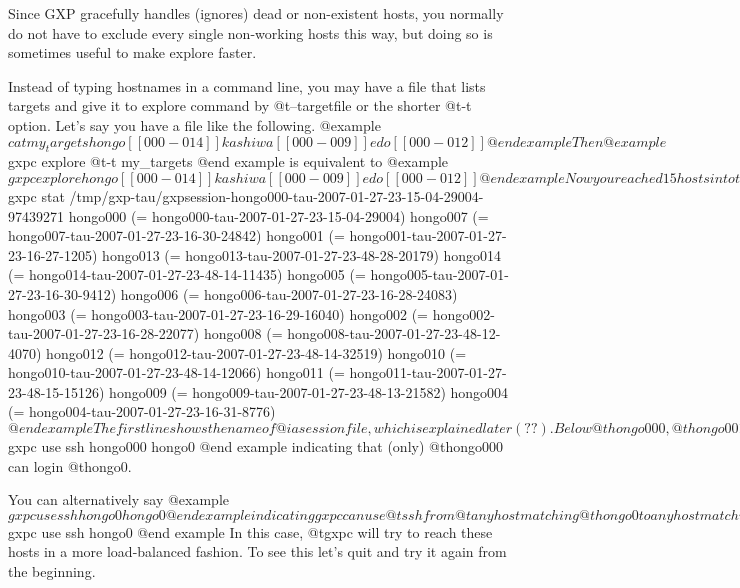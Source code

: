 Since GXP gracefully handles (ignores) dead or non-existent hosts, you
normally do not have to exclude every single non-working hosts this
way, but doing so is sometimes useful to make explore faster.

Instead of typing hostnames in a command line, you may have a file
that lists targets and give it to explore command by 
@t{--targetfile} or the shorter @t{-t} option.
Let's say you have a file like the following.
@example
$ cat my_targets
hongo[[000-014]]
kashiwa[[000-009]]
edo[[000-012]]
@end example
Then
@example
$ gxpc explore @t{-t my_targets}
@end example
is equivalent to
@example
$ gxpc explore hongo[[000-014]] kashiwa[[000-009]] edo[[000-012]]
@end example

Now you reached 15 hosts in total. The @t{stat} command shows 
hosts (daemons) connected.

@example
$ gxpc stat
/tmp/gxp-tau/gxpsession-hongo000-tau-2007-01-27-23-15-04-29004-97439271
hongo000 (= hongo000-tau-2007-01-27-23-15-04-29004)
 hongo007 (= hongo007-tau-2007-01-27-23-16-30-24842)
 hongo001 (= hongo001-tau-2007-01-27-23-16-27-1205)
 hongo013 (= hongo013-tau-2007-01-27-23-48-28-20179)
 hongo014 (= hongo014-tau-2007-01-27-23-48-14-11435)
 hongo005 (= hongo005-tau-2007-01-27-23-16-30-9412)
 hongo006 (= hongo006-tau-2007-01-27-23-16-28-24083)
 hongo003 (= hongo003-tau-2007-01-27-23-16-29-16040)
 hongo002 (= hongo002-tau-2007-01-27-23-16-28-22077)
 hongo008 (= hongo008-tau-2007-01-27-23-48-12-4070)
 hongo012 (= hongo012-tau-2007-01-27-23-48-14-32519)
 hongo010 (= hongo010-tau-2007-01-27-23-48-14-12066)
 hongo011 (= hongo011-tau-2007-01-27-23-48-15-15126)
 hongo009 (= hongo009-tau-2007-01-27-23-48-13-21582)
 hongo004 (= hongo004-tau-2007-01-27-23-16-31-8776)
$
@end example

The first line shows the name of @i{a session file}, which is
explained later (??).  Below
@t{hongo000}, @t{hongo001}--@t{hongo014} are indented by a single space,
which means @t{hongo000} issued logins to all these hosts. This
happened because we have previously said
@example
$ gxpc use ssh hongo000 hongo0
@end example
indicating that (only) @t{hongo000} can login @t{hongo0}.

You can alternatively say
@example
$ gxpc use ssh hongo0 hongo0
@end example
indicating gxpc can use @t{ssh} from @t{any} host matching @t{hongo0}
to any host matching @t{hongo0}. This can be abbreviated to:
@example
$ gxpc use ssh hongo0
@end example
In this case, @t{gxpc} will try to reach these hosts in a more
load-balanced fashion. To see this let's quit and 
try it again from the beginning.

